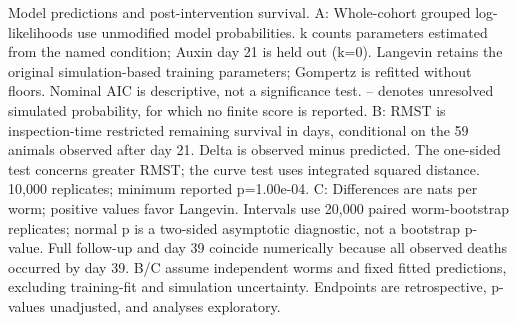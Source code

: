 \begin{table}[htbp]
\caption{Model predictions and post-intervention survival. A: Whole-cohort grouped log-likelihoods use unmodified model probabilities. k counts parameters estimated from the named condition; Auxin day 21 is held out (k=0). Langevin retains the original simulation-based training parameters; Gompertz is refitted without floors. Nominal AIC is descriptive, not a significance test. -- denotes unresolved simulated probability, for which no finite score is reported. B: RMST is inspection-time restricted remaining survival in days, conditional on the 59 animals observed after day 21. Delta is observed minus predicted. The one-sided test concerns greater RMST; the curve test uses integrated squared distance. 10,000 replicates; minimum reported p=1.00e-04. C: Differences are nats per worm; positive values favor Langevin. Intervals use 20,000 paired worm-bootstrap replicates; normal p is a two-sided asymptotic diagnostic, not a bootstrap p-value. Full follow-up and day 39 coincide numerically because all observed deaths occurred by day 39. B/C assume independent worms and fixed fitted predictions, excluding training-fit and simulation uncertainty. Endpoints are retrospective, p-values unadjusted, and analyses exploratory.}
\label{tab:supp_note2_corrected_comparison}
\end{table}

